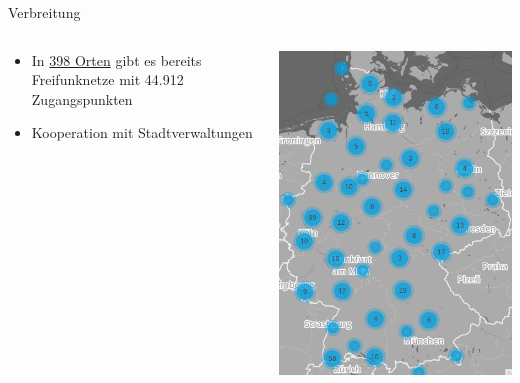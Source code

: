 \documentclass[t]{beamer}
\begin{document}
  \begin{frame}{Verbreitung}
    \begin{columns}
      \begin{column}{0.6\textwidth}
  \begin{itemize}
    \item In  \href{http://freifunk.net/wie-mache-ich-mit/community-finden/}{398 Orten} gibt es bereits Freifunknetze mit 44.912 Zugangspunkten
    \item Kooperation mit Stadtverwaltungen
  \end{itemize}
      \end{column}
      \begin{column}{0.4\textwidth}
  \begin{center}
    \includegraphics[width=\textwidth]{Bilder/community-map-2017-04-24}
  \end{center}
      \end{column}
    \end{columns}
  \end{frame}
  
\end{document}
